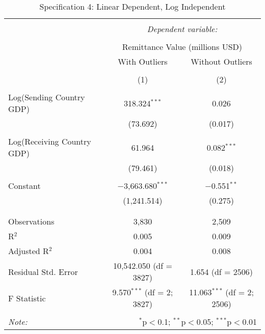 
\begin{table}[!htbp] \centering 
  \caption{Specification 4: Linear Dependent, Log Independent} 
  \label{} 
\begin{tabular}{@{\extracolsep{5pt}}lcc} 
\\[-1.8ex]\hline 
\hline \\[-1.8ex] 
 & \multicolumn{2}{c}{\textit{Dependent variable:}} \\ 
\cline{2-3} 
\\[-1.8ex] & \multicolumn{2}{c}{Remittance Value (millions USD)} \\ 
 & With Outliers & Without Outliers \\ 
\\[-1.8ex] & (1) & (2)\\ 
\hline \\[-1.8ex] 
 Log(Sending Country GDP) & 318.324$^{***}$ & 0.026 \\ 
  & (73.692) & (0.017) \\ 
  & & \\ 
 Log(Receiving Country GDP) & 61.964 & 0.082$^{***}$ \\ 
  & (79.461) & (0.018) \\ 
  & & \\ 
 Constant & $-$3,663.680$^{***}$ & $-$0.551$^{**}$ \\ 
  & (1,241.514) & (0.275) \\ 
  & & \\ 
\hline \\[-1.8ex] 
Observations & 3,830 & 2,509 \\ 
R$^{2}$ & 0.005 & 0.009 \\ 
Adjusted R$^{2}$ & 0.004 & 0.008 \\ 
Residual Std. Error & 10,542.050 (df = 3827) & 1.654 (df = 2506) \\ 
F Statistic & 9.570$^{***}$ (df = 2; 3827) & 11.063$^{***}$ (df = 2; 2506) \\ 
\hline 
\hline \\[-1.8ex] 
\textit{Note:}  & \multicolumn{2}{r}{$^{*}$p$<$0.1; $^{**}$p$<$0.05; $^{***}$p$<$0.01} \\ 
\end{tabular} 
\end{table} 
